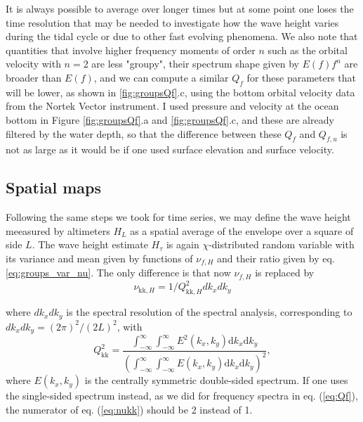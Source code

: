 {It is always possible to average over longer times but at some point one loses the time resolution that may be needed to investigate how the wave height varies during the tidal cycle or due to other fast evolving phenomena. We also note that quantities that involve higher frequency moments of order $n$ such as the orbital velocity with $n=2$ are less "groupy", their spectrum shape given by $E(f)f^n$ are broader than $E(f)$,  and we can compute a similar $Q_f$ for these parameters that will be lower, as shown in  \ref{fig:groupsQf}.c, using the bottom orbital velocity data from the Nortek Vector instrument. I used pressure and velocity at the ocean bottom in Figure \ref{fig:groupsQf}.a and \ref{fig:groupsQf}.c, and these are already filtered by the water depth, so that the difference between these  $Q_f$  and  $Q_{f,u}$ is not as large as it would be if one used surface elevation and surface velocity.  


\subsection{Spatial maps}
Following the same steps we took for time series, we may define the wave height meeasured by altimeters $H_{L}$ as a spatial average of the envelope over a 
square of side $L$. The wave height estimate $H_\tau$ is  again $\chi$-distributed random variable with its variance and mean given by  functions of $\nu_{f,H}$ and their ratio given by eq. \ref{eq:groups_var_nu}. The only difference is that now  $\nu_{f,H}$ is replaced by 
\begin{equation} 
\nu_{\mathrm{kk},H}=1/ Q_{\mathrm{kk},H}^2 dk_x dk_y \label{eq:nukk}
\end{equation}

 where $dk_x dk_y$ is the spectral resolution of the spectral analysis, corresponding to $dk_x dk_y=(2 \pi)^2/(2 L)^2$, with 
\begin{equation} 
   Q_{\mathrm{kk}}^2 = \frac{  \int_{-\infty}^\infty \int_{-\infty}^\infty E^2(k_x,k_y)\mathrm{d}k_x \mathrm{d}k_y }{\left( \int_{-\infty}^\infty \int_{-\infty}^\infty E(k_x,k_y)\mathrm{d}k_x \mathrm{d}k_y  \right)^2} \label{eq:Qkk},
\end{equation}
where  $E(k_x,k_y)$ is the centrally symmetric double-sided spectrum. If one uses the single-sided spectrum instead, as we did for frequency spectra in eq. (\ref{eq:Qf}), the numerator of eq. (\ref{eq:nukk}) should be 2 instead of 1. 

}
